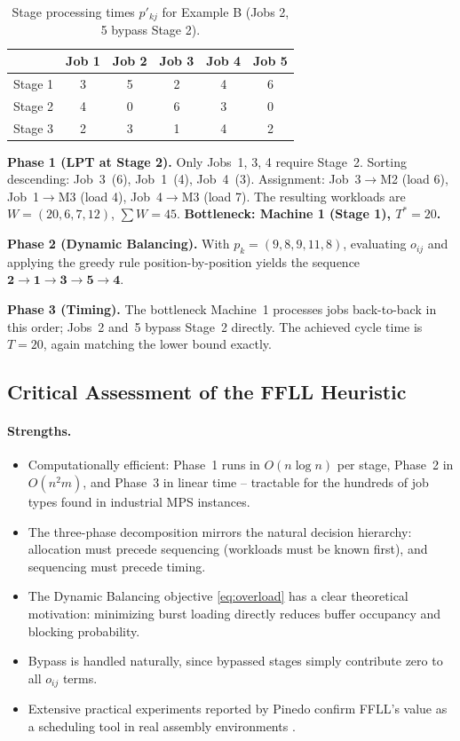 \documentclass[11pt,a4paper]{article}
\begin{document}
\begin{table}[h!]
\centering
\begin{tabular}{@{}lccccc@{}}
\toprule
 & Job 1 & Job 2 & Job 3 & Job 4 & Job 5 \\
\midrule
Stage 1 & 3 & 5 & 2 & 4 & 6 \\
Stage 2 & 4 & 0 & 6 & 3 & 0 \\
Stage 3 & 2 & 3 & 1 & 4 & 2 \\
\bottomrule
\end{tabular}
\caption{Stage processing times $p'_{kj}$ for Example B (Jobs 2, 5 bypass Stage 2).}
\end{table}

\textbf{Phase 1 (LPT at Stage 2).} Only Jobs~1, 3, 4 require Stage~2.
Sorting descending: Job~3~(6), Job~1~(4), Job~4~(3). Assignment:
Job~3$\to$M2 (load 6), Job~1$\to$M3 (load 4), Job~4$\to$M3 (load 7). The
resulting workloads are $W=(20,6,7,12)$, $\sum W = 45$.
\textbf{Bottleneck: Machine 1 (Stage 1), $T^\ast = 20$.}

\textbf{Phase 2 (Dynamic Balancing).} With $p_k = (9,8,9,11,8)$, evaluating
$o_{ij}$ and applying the greedy rule position-by-position yields the
sequence $\mathbf{2 \to 1 \to 3 \to 5 \to 4}$.

\textbf{Phase 3 (Timing).} The bottleneck Machine~1 processes jobs
back-to-back in this order; Jobs~2 and~5 bypass Stage~2 directly. The
achieved cycle time is $T = 20$, again matching the lower bound exactly.

\subsection{Critical Assessment of the FFLL Heuristic}

\paragraph{Strengths.}
\begin{itemize}
  \item Computationally efficient: Phase~1 runs in $O(n \log n)$ per
    stage, Phase~2 in $O(n^2 m)$, and Phase~3 in linear time -- tractable
    for the hundreds of job types found in industrial MPS instances.
  \item The three-phase decomposition mirrors the natural decision
    hierarchy: allocation must precede sequencing (workloads must be
    known first), and sequencing must precede timing.
  \item The Dynamic Balancing objective \eqref{eq:overload} has a clear
    theoretical motivation: minimizing burst loading directly reduces
    buffer occupancy and blocking probability.
  \item Bypass is handled naturally, since bypassed stages simply
    contribute zero to all $o_{ij}$ terms.
  \item Extensive practical experiments reported by Pinedo confirm FFLL's
    value as a scheduling tool in real assembly environments
    \citep{pinedo2016scheduling}.
\end{itemize}
\end{document}
